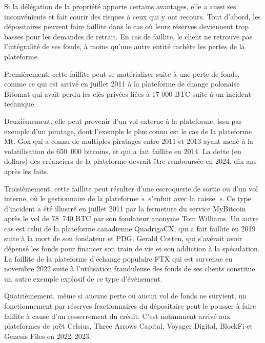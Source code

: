 Si la délégation de la propriété apporte certains avantages, elle a aussi ses inconvénients et fait courir des risques à ceux qui y ont recours. Tout d'abord, les dépositaires peuvent faire faillite dans le cas où leurs réserves deviennent trop basses pour les demandes de retrait. En cas de faillite, le client ne retrouve pas l'intégralité de ses fonds, à moins qu'une autre entité rachète les pertes de la plateforme.

Premièrement, cette faillite peut se matérialiser suite à une perte de fonds, comme ce qui est arrivé en juillet 2011 à la plateforme de change polonaise Bitomat qui avait perdu les clés privées liées à 17 000 BTC suite à un incident technique.

Deuxièmement, elle peut provenir d'un vol externe à la plateforme, issu par exemple d'un piratage, dont l'exemple le plus connu est le cas de la plateforme Mt. Gox qui a connu de multiples piratages entre 2011 et 2013 ayant mené à la volatilisation de 650~000 bitcoins, et qui a fait faillite en 2014. La dette (en dollars) des créanciers de la plateforme devrait être remboursée en 2024, dix ans après les faits. %

Troisièmement, cette faillite peut résulter d'une escroquerie de sortie ou d'un vol interne, où le gestionnaire de la plateforme «~s'enfuit avec la caisse~». Ce type d'incident a été illustré en juillet 2011 par la fermeture du service MyBitcoin après le vol de 78~740 BTC par son fondateur anonyme Tom Williams. Un autre cas est celui de la plateforme canadienne QuadrigaCX, qui a fait faillite en 2019 suite à la mort de son fondateur et PDG, Gerald Cotten, qui s'avérait avoir dépensé les fonds pour financer son train de vie et son addiction à la spéculation. La faillite de la plateforme d'échange populaire FTX qui est survenue en novembre 2022 suite à l'utilisation frauduleuse des fonds de ses clients constitue un autre exemple explosif de ce type d'évènement.

Quatrièmement, même si aucune perte ou aucun vol de fonds ne survient, un fonctionnement par réserves fractionnaires du dépositaire peut le pousser à faire faillite à cause d'un resserrement du crédit. C'est notamment arrivé aux plateformes de prêt Celsius, Three Arrows Capital, Voyager Digital, BlockFi et Genesis Files en 2022--2023.

